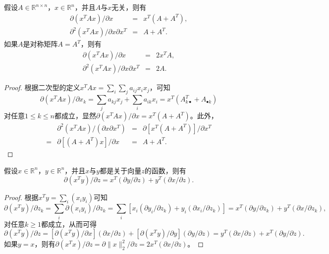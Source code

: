 \begin{corollary}
假设$A\in \mathbb R^{n\times n}$，$x\in \mathbb R^n$，并且$A$与$x$无关，则有
\begin{eqnarray}
  \partial (x^T A x)/\partial x &=& x^T (A + A^T), \\
  \partial^2 (x^T A x)/\partial x\partial x^T &=& A + A^T.
\end{eqnarray}
如果$A$是对称矩阵$A=A^T$，则有
\begin{eqnarray}
  \partial (x^T A x)/\partial x &=& 2 x^T A, \\
  \partial^2 (x^T A x)/\partial x\partial x^T &=& 2A.
\end{eqnarray}
\end{corollary}
\begin{proof}
根据二次型的定义$x^T A x = \sum\limits_i \sum\limits_j a_{ij} x_i x_j$，可知
\[
    \partial (x^T A x)/\partial x_k = \sum\limits_j a_{kj} x_j + \sum\limits_i a_{ik} x_i = x^T (A_{k\bullet}^T + A_{\bullet k})
\]
对任意$1\le k\le n$都成立，显然$\partial (x^T A x)/\partial x = x^T (A + A^T)$。此外，
\[
    \begin{array}{rlcl}
        & \partial^2 (x^T Ax)/(\partial x\partial x^T) &=& \partial [x^T (A + A^T)]/\partial x^T\\
        = & \partial [(A + A^T)x] /\partial x &=& A + A^T.
    \end{array}
\]
\end{proof}

\begin{proposition}
假设$x\in \mathbb R^n$，$y\in \mathbb R^n$，并且$x$与$y$都是关于向量$z$的函数，则有
\begin{equation}
    \partial (x^T y)/\partial z = x^T (\partial y/\partial z) + y^T (\partial x/\partial z).
\end{equation}
\end{proposition}
\begin{proof}
根据$x^T y=\sum\limits_i (x_i y_i)$可知
\[
    \partial (x^T y)/\partial z_k = \sum\limits_i \partial (x_i y_i)/\partial z_k = \sum\limits_i [x_i (\partial y_i/\partial z_k) + y_i (\partial x_i/\partial z_k)] = x^T (\partial y/\partial z_k) + y^T (\partial x/\partial z_k),
\]
对任意$k\ge 1$都成立，从而可得
\begin{equation}
    \partial (x^T y)/\partial z = [\partial (x^T y)/\partial x](\partial x/\partial z) + [\partial (x^T y)/\partial y](\partial y/\partial z) = y^T (\partial x/\partial z) + x^T (\partial y/\partial z).
\end{equation}
如果$y=x$，则有$\partial (x^T x)/\partial z = \partial \|x\|_2^2/\partial z = 2 x^T (\partial x/\partial z)$。
\end{proof}

